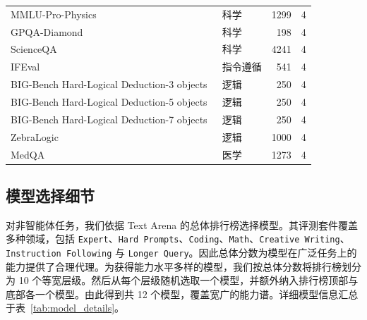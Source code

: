 \begin{table}[h]
{\begin{tabular}{l l r r}
MMLU-Pro-Physics~\cite{wang2024mmlu} & 科学 & 1299 & 4 \\
GPQA-Diamond~\cite{rein2024gpqa} & 科学 & 198 & 4 \\
ScienceQA~\cite{lu2022learn} & 科学 & 4241 & 4 \\
\midrule
IFEval~\cite{zhou2023instruction} & 指令遵循 & 541 & 4 \\
\midrule
BIG-Bench Hard-Logical Deduction-3 objects~\cite{suzgun2022challenging} & 逻辑 & 250  & 4 \\
BIG-Bench Hard-Logical Deduction-5 objects~\cite{suzgun2022challenging} & 逻辑 & 250  & 4 \\
BIG-Bench Hard-Logical Deduction-7 objects~\cite{suzgun2022challenging} & 逻辑 & 250 & 4 \\
ZebraLogic~\cite{zebralogic2025} & 逻辑 & 1000 & 4 \\
\midrule
MedQA~\cite{jin2021disease} & 医学 & 1273 & 4 \\
\bottomrule
\end{tabular}
}
\end{table}

\subsection{模型选择细节}
\label{sec:app_model_details}

对非智能体任务，我们依据 Text Arena 的总体排行榜选择模型。其评测套件覆盖多种领域，包括 \texttt{Expert}、\texttt{Hard Prompts}、\texttt{Coding}、\texttt{Math}、\texttt{Creative Writing}、\texttt{Instruction Following} 与 \texttt{Longer Query}。因此总体分数为模型在广泛任务上的能力提供了合理代理。为获得能力水平多样的模型，我们按总体分数将排行榜划分为 10 个等宽层级。然后从每个层级随机选取一个模型，并额外纳入排行榜顶部与底部各一个模型。由此得到共 12 个模型，覆盖宽广的能力谱。详细模型信息汇总于表~\ref{tab:model_details}。

